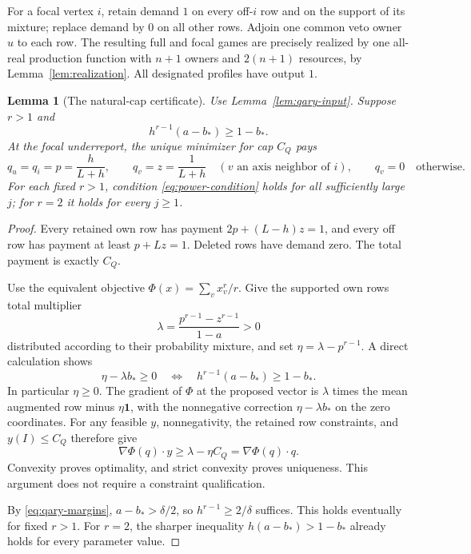 \documentclass[11pt]{article}
\newtheorem{lemma}[theorem]{Lemma}
\theoremstyle{definition}
\theoremstyle{remark}
\begin{document}
For a focal vertex $i$, retain demand $1$ on every off-$i$ row and on
the support of its mixture; replace demand by $0$ on all other rows.
Adjoin one common veto owner $u$ to each row.  The resulting full and
focal games are precisely realized by one all-real production function
with $n+1$ owners and $2(n+1)$ resources, by
Lemma~\ref{lem:realization}.  All designated profiles have output $1$.

\begin{lemma}[The natural-cap certificate]
\label{lem:power-certificate}
Use Lemma~\ref{lem:qary-input}.  Suppose $r>1$ and
\begin{equation}
 h^{r-1}(a-b_*)\ge1-b_*.
 \label{eq:power-condition}
\end{equation}
At the focal underreport, the unique minimizer for cap $C_Q$ pays
\[
 q_u=q_i=p=\frac h{L+h},\qquad
 q_v=z=\frac1{L+h}\quad(v\text{ an axis neighbor of }i),
 \qquad q_v=0\quad\text{otherwise}.
\]
For each fixed $r>1$, condition \eqref{eq:power-condition} holds for all
sufficiently large $j$; for $r=2$ it holds for every $j\ge1$.
\end{lemma}
\begin{proof}
Every retained own row has payment $2p+(L-h)z=1$, and every off row has
payment at least $p+Lz=1$.  Deleted rows have demand zero.  The total
payment is exactly $C_Q$.

Use the equivalent objective $\Phi(x)=\sum_v x_v^r/r$.  Give the supported
own rows total multiplier
\[
 \lambda=\frac{p^{r-1}-z^{r-1}}{1-a}>0
\]
distributed according to their probability mixture, and set
$\eta=\lambda-p^{r-1}$.  A direct calculation shows
\[
 \eta-\lambda b_*\ge0
 \quad\Longleftrightarrow\quad
 h^{r-1}(a-b_*)\ge1-b_*.
\]
In particular $\eta\ge0$.  The gradient of $\Phi$ at the proposed vector
is $\lambda$ times the mean augmented row minus $\eta\mathbf1$, with
the nonnegative correction $\eta-\lambda b_*$ on the zero coordinates.
For any feasible $y$, nonnegativity, the retained row constraints, and
$y(I)\le C_Q$ therefore give
\[
 \nabla\Phi(q)\cdot y\ge\lambda-\eta C_Q
                          =\nabla\Phi(q)\cdot q.
\]
Convexity proves optimality, and strict convexity proves uniqueness.
This argument does not require a constraint qualification.

By \eqref{eq:qary-margins}, $a-b_*>\delta/2$, so
$h^{r-1}\ge2/\delta$ suffices.  This holds eventually for fixed $r>1$.
For $r=2$, the sharper inequality $h(a-b_*)>1-b_*$ already holds for
every parameter value.
\end{proof}
\end{document}
